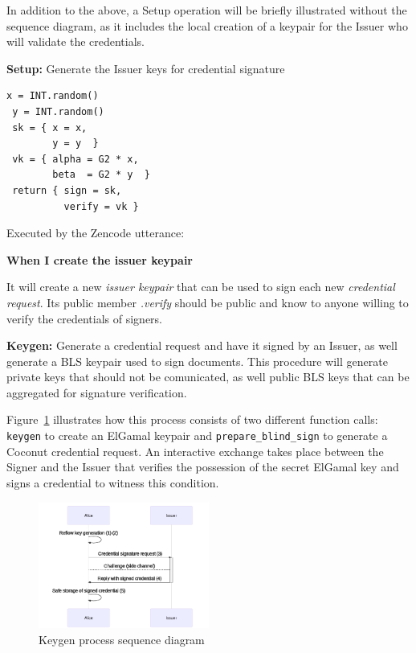 \documentclass[twocolumn]{article}
\begin{document}
In addition to the above, a Setup operation will be briefly
illustrated without the sequence diagram, as it includes the local
creation of a keypair for the Issuer who will validate the
credentials.

\textbf{Setup:} Generate the Issuer keys for credential signature

\begin{lstlisting}[style=lua]
 x = INT.random()
 y = INT.random()
 sk = { x = x,
        y = y  }
 vk = { alpha = G2 * x,
        beta  = G2 * y  }
 return { sign = sk,
          verify = vk }
\end{lstlisting}

Executed by the Zencode utterance:

\textbf{When I create the issuer keypair}

It will create a new \emph{issuer keypair} that can be used to sign
each new \emph{credential request}. Its public member \emph{.verify}
should be public and know to anyone willing to verify the credentials
of signers.

\textbf{Keygen:} Generate a credential request and have it signed by
an Issuer, as well generate a BLS keypair used to sign documents. This
procedure will generate private keys that should not be comunicated,
as well public BLS keys that can be aggregated for signature
verification.

Figure~\ref{fig:keygen} illustrates how this process consists of two
different function calls: \verb!keygen! to create an ElGamal keypair
and \verb!prepare_blind_sign! to generate a Coconut credential
request. An interactive exchange takes place between the Signer and
the Issuer that verifies the possession of the secret ElGamal key and
signs a credential to witness this condition.

\begin{figure}
  \caption{Keygen process sequence diagram}
  \label{fig:keygen}
  \centering
  \includegraphics[width=0.5\textwidth]{keygen-seq}
\end{figure}
\end{document}
